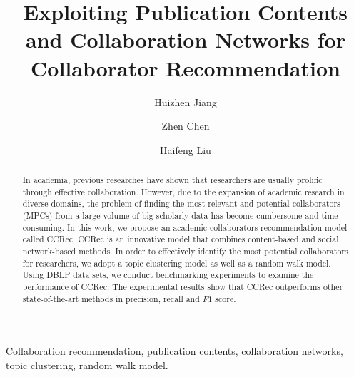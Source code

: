 \documentclass[review]{elsarticle}
\begin{document}
\begin{frontmatter}

\title{Exploiting Publication Contents and Collaboration Networks for Collaborator Recommendation}



%

\author[mymainaddress]{Huizhen Jiang}
\author[mymainaddress]{Zhen Chen}
\author[mymainaddress]{Haifeng Liu}
\address[mymainaddress]{Dalian University of Technology, Dalian, China}
\begin{abstract}
In academia, previous researches have shown that researchers are usually prolific through effective collaboration. However, due to the expansion of academic research in diverse domains, the problem of finding the most relevant and potential collaborators (MPCs) from a large volume of big scholarly data has become cumbersome and time-consuming. In this work, we propose an academic collaborators recommendation model called CCRec. CCRec is an innovative model that combines content-based and social network-based methods. In order to effectively identify the most potential collaborators for researchers, we adopt a topic clustering model as well as a random walk model. Using DBLP data sets, we conduct benchmarking experiments to examine the performance of CCRec. The experimental results show that CCRec outperforms other state-of-the-art methods in precision, recall and $F1$ score.
\end{abstract}

\begin{keyword}
Collaboration recommendation, publication contents, collaboration networks, topic clustering, random walk model.
\end{keyword}

\end{frontmatter}
\end{document}
